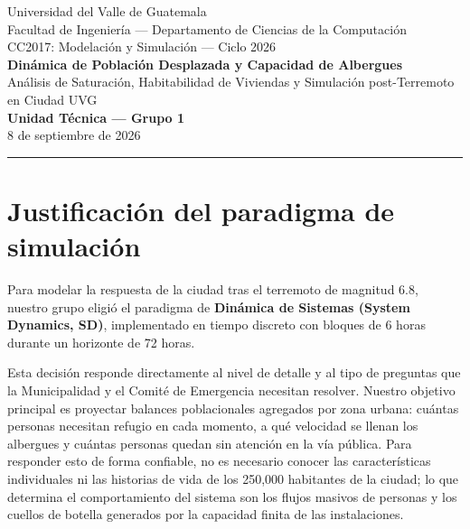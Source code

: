 \documentclass[10pt,letterpaper]{article}
\begin{document}
\begin{center}
    {\large Universidad del Valle de Guatemala}\\[2pt]
    {\normalsize Facultad de Ingeniería — Departamento de Ciencias de la Computación}\\[2pt]
    {\small CC2017: Modelación y Simulación — Ciclo 2026}\\[16pt]
    
    {\Large\textbf{Dinámica de Población Desplazada y Capacidad de Albergues}}\\[4pt]
    {\large Análisis de Saturación, Habitabilidad de Viviendas y Simulación post-Terremoto en Ciudad UVG}\\[12pt]
    
    \textbf{Unidad Técnica — Grupo 1}\\[4pt]
    \small 8 de septiembre de 2026
\end{center}

\vspace{10pt}
\hrule
\vspace{15pt}

\section{Justificación del paradigma de simulación}

Para modelar la respuesta de la ciudad tras el terremoto de magnitud 6.8, nuestro grupo eligió el paradigma de \textbf{Dinámica de Sistemas (System Dynamics, SD)}, implementado en tiempo discreto con bloques de 6 horas durante un horizonte de 72 horas. 

Esta decisión responde directamente al nivel de detalle y al tipo de preguntas que la Municipalidad y el Comité de Emergencia necesitan resolver. Nuestro objetivo principal es proyectar balances poblacionales agregados por zona urbana: cuántas personas necesitan refugio en cada momento, a qué velocidad se llenan los albergues y cuántas personas quedan sin atención en la vía pública. Para responder esto de forma confiable, no es necesario conocer las características individuales ni las historias de vida de los 250,000 habitantes de la ciudad; lo que determina el comportamiento del sistema son los flujos masivos de personas y los cuellos de botella generados por la capacidad finita de las instalaciones.
\end{document}
